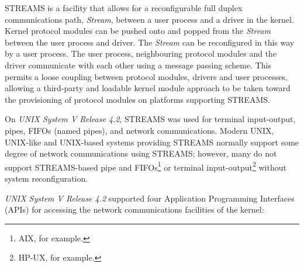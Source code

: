 \documentclass[letterpaper,final,notitlepage,twocolumn,10pt,twoside]{article}
\begin{document}
STREAMS is a facility that allows for a reconfigurable full duplex
communications path, \textit{Stream}, between a user process and a driver in
the kernel.  Kernel protocol modules can be pushed onto and popped from the
\textit{Stream} between the user process and driver.  The \textit{Stream} can
be reconfigured in this way by a user process.  The user process, neighbouring
protocol modules and the driver communicate with each other using a message
passing scheme.  This permits a loose coupling between protocol modules,
drivers and user processes, allowing a third-party and loadable kernel module
approach to be taken toward the provisioning of protocol modules on platforms
supporting STREAMS.

On \textsl{UNIX System V Release 4.2}, STREAMS was used for terminal
input-output, pipes, FIFOs (named pipes), and network communications.  Modern
UNIX, UNIX-like and UNIX-based systems providing STREAMS normally support some
degree of network communications using STREAMS; however, many do not support
STREAMS-based pipe and FIFOs\footnote{AIX, for example.} or terminal
input-output\footnote{HP-UX, for example.} without system reconfiguration.

\textsl{UNIX System V Release 4.2} supported four Application Programming
Interfaces (APIs) for accessing the network communications facilities of the
kernel:
\end{document}
